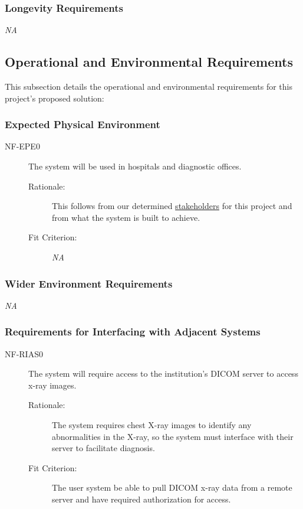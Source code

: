 \documentclass[12pt]{article}
\begin{document}
\subsubsection{Longevity Requirements}
\textit{NA}

\subsection{Operational and Environmental Requirements}
This subsection details the operational and environmental requirements for this project's proposed solution:

\subsubsection{Expected Physical Environment}
\begin{description}
    \item[NF-EPE0] The system will be used in hospitals and diagnostic offices. 
    \begin{description}
        \item[Rationale:] This follows from our determined \hyperlink{Users}{stakeholders} for this project and from what the system is built to achieve. 
        \item[Fit Criterion:] \textit{NA}
    \end{description}
\end{description}

\subsubsection{Wider Environment Requirements}
\textit{NA}

\subsubsection{Requirements for Interfacing with Adjacent Systems}
\begin{description}
    \item[NF-RIAS0] The system will require access to the institution's DICOM server to access x-ray images. 
    \begin{description}
        \item[Rationale:] The system requires chest X-ray images to identify any abnormalities in the X-ray, so the system must interface with their server to facilitate diagnosis.  
        \item[Fit Criterion:] The user system be able to pull DICOM x-ray data from a remote server and have required authorization for access.
    \end{description}
\end{description}
\end{document}
